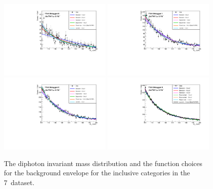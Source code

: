\begin{figure}
  \includegraphics[width=0.49\textwidth]{analysis/plots/multipdf_plots/cat0_7TeV.pdf}
  \includegraphics[width=0.49\textwidth]{analysis/plots/multipdf_plots/cat1_7TeV.pdf}\\
  \includegraphics[width=0.49\textwidth]{analysis/plots/multipdf_plots/cat2_7TeV.pdf}
  \includegraphics[width=0.49\textwidth]{analysis/plots/multipdf_plots/cat3_7TeV.pdf}\\
  \caption{The diphoton invariant mass distribution and the function choices for the background envelope for the inclusive categories in the 7~\TeV dataset.}
  \label{fig:multipdf1}
\end{figure}

